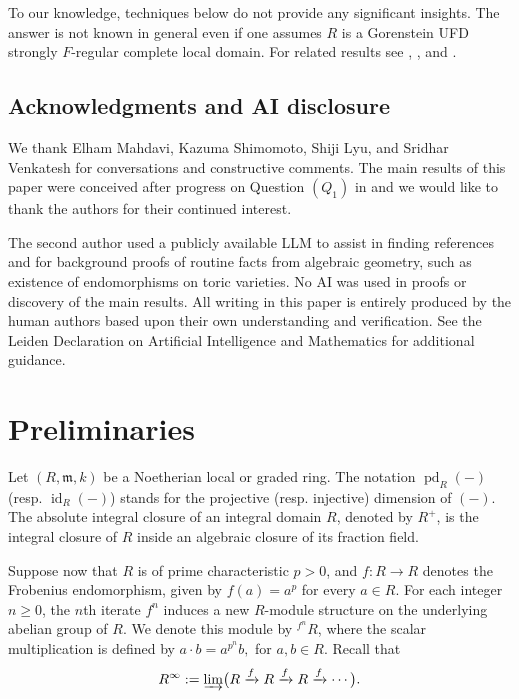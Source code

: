 \documentclass[12pt,reqno]{amsart}
\theoremstyle{definition}
\theoremstyle{remark}
\theoremstyle{cited}
\theoremstyle{remark}
\theoremstyle{citeddef}
\DeclareMathOperator{\id}{id}
\DeclareMathOperator{\pd}{pd}
\begin{document}
	To our knowledge, techniques below do not provide any significant insights. The answer is not known in general even if one assumes $R$ is a Gorenstein UFD strongly $F$-regular complete local domain. For related results see \cite{Pat}, \cite{Simp}, \cite{AB} and \cite{moh}.
	
	\subsection{Acknowledgments and AI disclosure}
	
	
	We thank Elham Mahdavi, Kazuma Shimomoto, Shiji Lyu, and Sridhar Venkatesh for conversations and constructive comments. The main results of this paper were conceived after progress on Question $(Q_1)$ in \cite{Elham} and we would like to thank the authors for their continued interest.  
	
	The second author used a publicly available LLM to assist in finding references and for background proofs of routine facts from algebraic geometry, such as existence of endomorphisms on toric varieties. No AI was used in proofs or discovery of the main results. All writing in this paper is entirely produced by the human authors based upon their own understanding and verification. See the Leiden Declaration on Artificial Intelligence and Mathematics \cite{Leiden} for additional guidance.
	
	
	
	
	\section{Preliminaries}
	Let $(R,\mathfrak m,k)$ be a Noetherian  local or graded ring.
	The notation \(\pd_R(-)\) (resp. \(\id_R(-)\)) stands for the projective (resp. injective) dimension of \((-)\).
	The absolute integral closure of an integral domain \(R\), denoted by \(R^{+}\), is the integral closure of \(R\) inside an algebraic closure of its fraction field.
	
	
	Suppose now that $R$ is of prime characteristic $p>0$, and
	$f: R \to R$
	denotes the Frobenius endomorphism, given by $f(a)=a^p$ for every $a\in R$. For each integer $n\geq 0$, the $n$th iterate $f^n$ induces a new $R$-module structure on the underlying abelian group of $R$. We denote this module by ${}^{f^n}\!R$, where the scalar multiplication is defined by
	\(
	a\cdot b = a^{p^n} b,
	\)
	for $a,b\in R$.
	Recall that
	\[
	R^\infty := \varinjlim \bigl( R \xrightarrow{f} R \xrightarrow{f} R \xrightarrow{f} \cdots \bigr).
	\]
	
\end{document}

